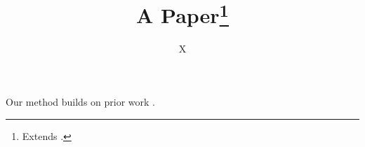 \documentclass{article}
\title{A Paper\thanks{Extends \citet{a}.}}
\author{X}
\begin{document}
\maketitle
Our method builds on prior work \citep{a,b}.


\end{document}
